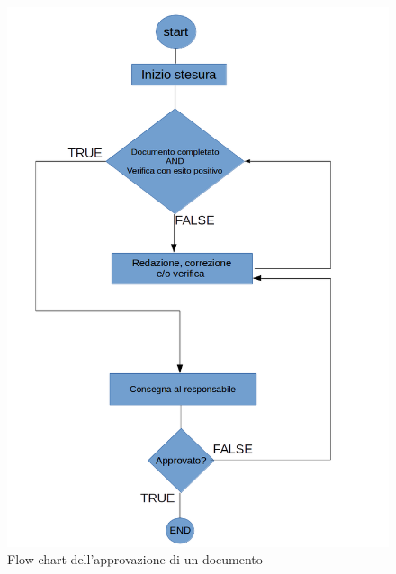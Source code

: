 \begin{figure}[h]
	\centering
	\includegraphics[scale=0.4]{img/flussoapprovazione.png}
	\caption{Flow chart dell'approvazione di un documento}\label{sec:Figura2}
\end{figure}
\newpage
